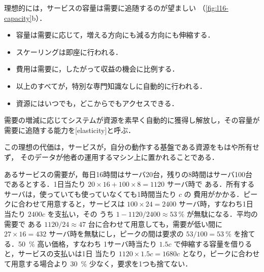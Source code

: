 \documentclass[../main.tex]{subfiles}
\begin{document}
理想的には，サービスの容量は需要に追随するのが望ましい
（\cref{fig:l16-capacity}b）．
\begin{itemize}
  \item 容量は需要に応じて，増える方向にも減る方向にも伸縮する．
  \item スケーリングは即座に行われる．
  \item 費用は需要に，したがって収益の機会に比例する．
  \item 以上のすべてが，特別な専門知識なしに自動的に行われる．
  \item 資源にはいつでも，どこからでもアクセスできる．
\end{itemize}

\begin{definition}[伸縮性]
  需要の増減に応じてシステムが資源を素早く自動的に獲得し解放し，その容量が
  需要に追随する能力を[elasticity]と呼ぶ．
\end{definition}

この理想の代価は，サービスが，自分の動作する基盤である資源をもはや所有せず，
そのデータが他者の運用するマシン上に置かれることである．

\begin{example}
  あるサービスの需要が，毎日16時間はサーバ20台，残りの8時間はサーバ100台
  であるとする．1日当たり $20 \times 16 + 100 \times 8 = 1120$ サーバ時で
  ある．所有するサーバは，使っていても使っていなくても1時間当たり $c$ の
  費用がかかる．ピークに合わせて用意すると，サービスは
  $100 \times 24 = 2400$ サーバ時，すなわち1日当たり $2400c$ を支払い，その
  うち $1 - 1120/2400 \approx \SI{53}{\percent}$ が無駄になる．平均の需要で
  ある $1120/24 \approx 47$ 台に合わせて用意しても，需要が低い間に
  $27 \times 16 = 432$ サーバ時を無駄にし，ピークの間は要求の
  $53/100 = \SI{53}{\percent}$ を捨てる．\SI{50}{\percent} 高い価格，すなわち
  1サーバ時当たり $1.5c$ で伸縮する容量を借りると，サービスの支払いは1日
  当たり $1120 \times 1.5c = 1680c$ となり，ピークに合わせて用意する場合より
  \SI{30}{\percent} 少なく，要求を1つも捨てない．
\end{example}
\end{document}
